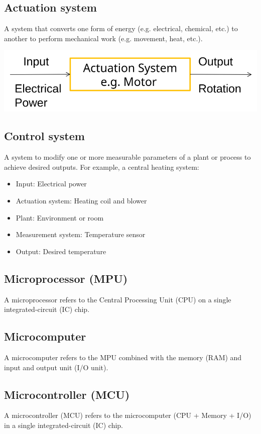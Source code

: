 \documentclass[11pt]{article}
\begin{document}
\subsection{Actuation system}
\label{sec:orgf9d2c43}
A system that converts one form of energy (e.g. electrical, chemical, etc.) to another to perform mechanical work (e.g. movement, heat, etc.).
\begin{center}
\includegraphics[width=.9\linewidth]{./images/actuation-system.png}
\end{center}

\subsection{Control system}
\label{sec:org2a62b18}
A system to modify one or more measurable parameters of a plant or process to achieve desired outputs. For example, a central heating system:
\begin{itemize}
\item Input: Electrical power
\item Actuation system: Heating coil and blower
\item Plant: Environment or room
\item Measurement system: Temperature sensor
\item Output: Desired temperature
\end{itemize}

\subsection{Microprocessor (MPU)}
\label{sec:org2122709}
A microprocessor refers to the Central Processing Unit (CPU) on a single integrated-circuit (IC) chip.

\subsection{Microcomputer}
\label{sec:org0885f01}
A microcomputer refers to the MPU combined with the memory (RAM) and input and output unit (I/O unit).

\subsection{Microcontroller (MCU)}
\label{sec:orga55b1ce}
A microcontroller (MCU) refers to the microcomputer (CPU + Memory + I/O) in a single integrated-circuit (IC) chip.
\end{document}
